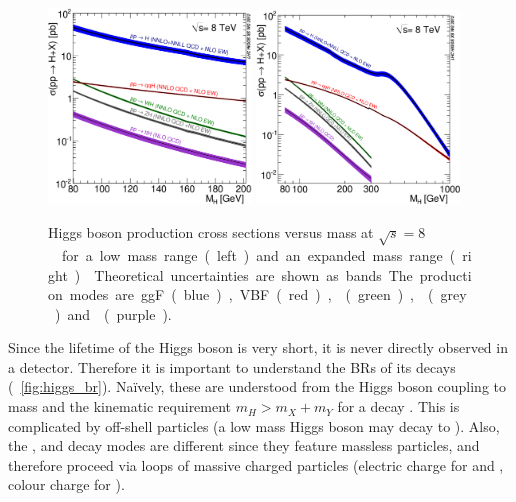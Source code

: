 \begin{figure}
	\includegraphics[width=0.48\textwidth]{tex/motivation/xs_lowrange}
	\hfill
	\includegraphics[width=0.48\textwidth]{tex/motivation/xs_fullrange}
	\caption{Higgs boson production cross sections versus mass at 
	\unit{$\sqrt{s} = 8$}{\TeV} for a low mass range (left) and an expanded mass range 
	(right) \cite{YR2}. Theoretical uncertainties are shown as bands. The production modes
	are \ac{ggF} (blue), \ac{VBF} (red), \WH (green), \ZH (grey) and \ttH (purple).}
	\label{fig:higgs_xs}
\end{figure}

Since the lifetime of the Higgs boson is very short, it is never directly observed in a 
detector. Therefore it is important to understand the \acp{BR} of its decays 
(\Figure~\ref{fig:higgs_br}). Na\"{i}vely, these are understood from the Higgs boson coupling to mass and the kinematic requirement $m_H > m_X + m_Y$ for a decay
. This is complicated by off-shell particles (\eg a low mass
Higgs boson may decay to \HepProcess{\PW \PW^{*}}). 
Also, the \HepProcess{\Pphoton \Pphoton}, \HepProcess{\PZ \Pphoton} and 
\HepProcess{\Pgluon \Pgluon} decay modes are different since they feature massless 
particles, and therefore proceed via loops of massive charged particles (electric charge 
for \HepProcess{\Pphoton \Pphoton} and \HepProcess{\PZ \Pphoton}, colour charge for 
\HepProcess{\Pgluon \Pgluon}).

